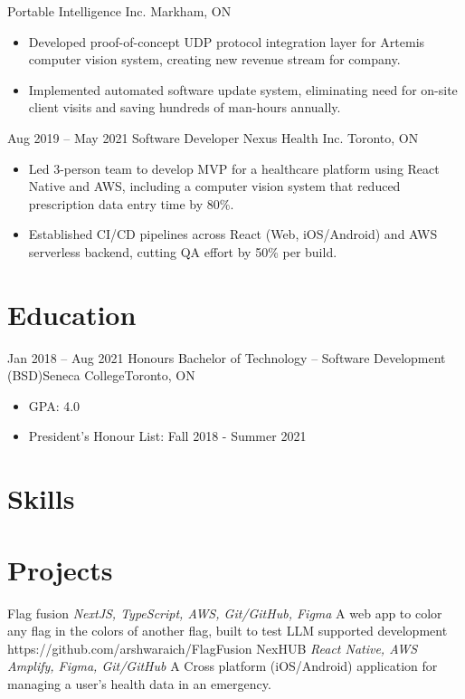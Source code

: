 \documentclass[letterpaper]{moderncv}
\begin{document}
{Portable Intelligence Inc.}
{Markham, ON}
{}
{\begin{itemize}%
	\item Developed proof-of-concept UDP protocol integration layer for Artemis computer vision system, creating new revenue stream for company.
	\item Implemented automated software update system, eliminating need for on-site client visits and saving hundreds of man-hours annually.
	\end{itemize}}
\cventry
{Aug 2019 -- May 2021}
{Software Developer}
{Nexus Health Inc.}
{Toronto, ON}
{}
{\begin{itemize}%
	\item Led 3-person team to develop MVP for a healthcare platform using React Native and AWS, including a computer vision system that reduced prescription data entry time by 80\%.
    \item Established CI/CD pipelines across React (Web, iOS/Android) and AWS serverless backend, cutting QA effort by 50\% per build.
	\end{itemize}}

\section{Education}
\cventry
{Jan 2018 -- Aug 2021}
{Honours Bachelor of Technology – Software Development (BSD)}{Seneca College}{Toronto, ON}{}
{\begin{itemize}%
	\item GPA: 4.0
	\item President's Honour List: Fall 2018 - Summer 2021
	\end{itemize}}

\section{Skills}
\section{Projects}
\cventry
{}
{Flag fusion}
{}
{\textit{NextJS, TypeScript, AWS, Git/GitHub, Figma}}
{}
{A web app to color any flag in the colors of another flag, built to test LLM supported development\\https://github.com/arshwaraich/FlagFusion}
\vspace{1mm}
\cventry
{}
{NexHUB}
{}
{\textit{React Native, AWS Amplify, Figma, Git/GitHub}}
{}
{A Cross platform (iOS/Android) application for managing a user's health data in an emergency.}
\vspace{1mm}
\end{document}
